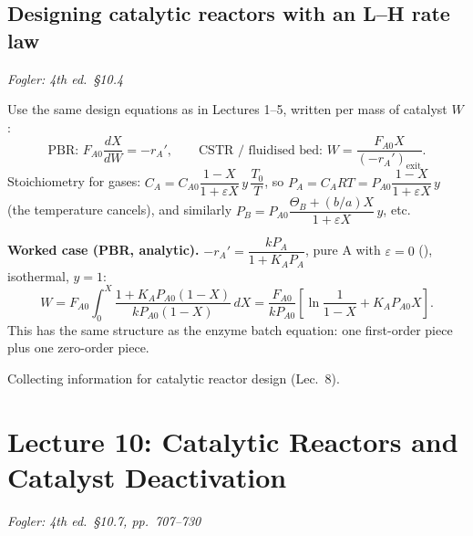 \documentclass[11pt]{article}
\newcommand{\fogler}[1]{\hfill{\small\textit{\textcolor{keyblue}{Fogler: #1}}}}
\begin{document}
\subsection{Designing catalytic reactors with an L--H rate law}
\fogler{4th ed.\ \S10.4}

Use the same design equations as in Lectures 1--5, written per mass of catalyst $W$:
\[
\text{PBR: } F_{A0}\frac{dX}{dW}=-r_A',\qquad
\text{CSTR / fluidised bed: } W=\frac{F_{A0}X}{(-r_A')_{\text{exit}}}.
\]
Stoichiometry for gases: $C_A=C_{A0}\dfrac{1-X}{1+\varepsilon X}\,y\,\dfrac{T_0}{T}$, so $P_A=C_ART=P_{A0}\dfrac{1-X}{1+\varepsilon X}\,y$ (the temperature cancels), and similarly
$P_B=P_{A0}\dfrac{\Theta_B+(b/a)X}{1+\varepsilon X}\,y$, etc.

\textbf{Worked case (PBR, analytic).} $-r_A'=\dfrac{kP_A}{1+K_AP_A}$, pure A with $\varepsilon=0$ (), isothermal, $y=1$:
\[
W=F_{A0}\int_0^X\frac{1+K_AP_{A0}(1-X)}{kP_{A0}(1-X)}\,dX
=\frac{F_{A0}}{kP_{A0}}\left[\ln\frac{1}{1-X}+K_AP_{A0}X\right].
\]
This has the same structure as the enzyme batch equation: one first-order piece plus one zero-order piece.

\begin{center}

{\small Collecting information for catalytic reactor design (Lec.~8).}
\end{center}

\section{Lecture 10: Catalytic Reactors and Catalyst Deactivation}
\fogler{4th ed.\ \S10.7, pp.~707--730}
\end{document}
